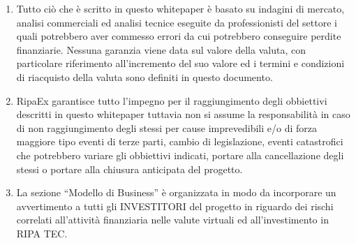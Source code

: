 \begin{scriptsize}
{\begin{enumerate}
			a proteggere le informazioni confidenziali, assicurando che non venga in alcun modo compromesso il carattere della loro riservatezza 
			anche da parte dei propri collaboratori/dipendenti/consulenti.
			Questi dati sono destinati esclusivamente all'utilizzo privato da parte dell’Utente. In caso di infrazione, l'utente si assume 
			la responsabilità delle proprie azioni e si espone a procedimenti giudiziari, in particolare per contraffazione.
			L'obbligo di confidenzialità vincola, oltre al ricevente, il proprio consulente professionale, l'amministratore, il dipendente
			o qualsiasi altra persona che prenderà parte al progetto RipaEx come l'esecutore dello stesso ovvero i suoi beneficiari.
			\item Tutto ciò che è scritto in questo whitepaper è basato su indagini di mercato, analisi commerciali ed analisi tecnice 
			eseguite da professionisti del settore i quali potrebbero aver commesso errori da cui potrebbero conseguire perdite finanziarie. 
			Nessuna garanzia viene data sul valore della valuta, con particolare riferimento all'incremento del suo valore ed i termini e
			condizioni di riacquisto della valuta sono definiti in questo documento.
			\item RipaEx garantisce tutto l'impegno per il raggiungimento degli obbiettivi descritti in questo
			whitepaper tuttavia non si assume la responsabilità in caso di non raggiungimento degli stessi per cause imprevedibili e/o 
			di forza maggiore tipo eventi di terze parti, cambio di legislazione, eventi catastrofici che potrebbero variare gli obbiettivi indicati,
			portare alla cancellazione degli stessi o portare alla chiusura anticipata del progetto.
			\item La sezione ``Modello di Business'' è organizzata in modo da incorporare un avvertimento
			a tutti gli INVESTITORI del progetto in riguardo dei rischi correlati all'attività finanziaria nelle valute virtuali ed
			all'investimento in RIPA TEC.
		\end{enumerate}		
	}
\end{scriptsize}
